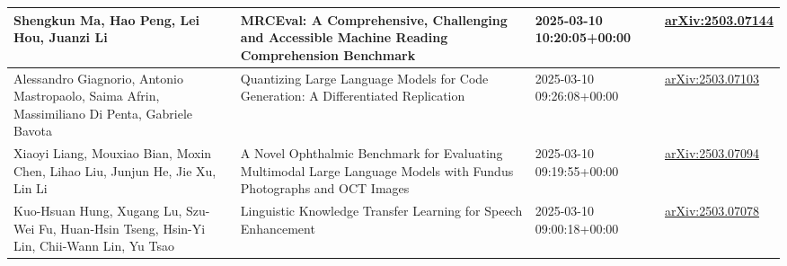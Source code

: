\documentclass[dvipdfmx]{article}
\newlength\autolength
\begin{document}
\begin{longtable}{|P{\autolength}|P{\autolength}|P{\autolength}|P{\autolength}|}
Shengkun Ma, Hao Peng, Lei Hou, Juanzi Li & MRCEval: A Comprehensive, Challenging and Accessible Machine Reading Comprehension Benchmark & 2025-03-10 10:20:05+00:00 & \href{http://arxiv.org/abs/2503.07144v1}{arXiv:2503.07144} \\ \hline
Alessandro Giagnorio, Antonio Mastropaolo, Saima Afrin, Massimiliano Di Penta, Gabriele Bavota & Quantizing Large Language Models for Code Generation: A Differentiated Replication & 2025-03-10 09:26:08+00:00 & \href{http://arxiv.org/abs/2503.07103v1}{arXiv:2503.07103} \\ \hline
Xiaoyi Liang, Mouxiao Bian, Moxin Chen, Lihao Liu, Junjun He, Jie Xu, Lin Li & A Novel Ophthalmic Benchmark for Evaluating Multimodal Large Language Models with Fundus Photographs and OCT Images & 2025-03-10 09:19:55+00:00 & \href{http://arxiv.org/abs/2503.07094v1}{arXiv:2503.07094} \\ \hline
Kuo-Hsuan Hung, Xugang Lu, Szu-Wei Fu, Huan-Hsin Tseng, Hsin-Yi Lin, Chii-Wann Lin, Yu Tsao & Linguistic Knowledge Transfer Learning for Speech Enhancement & 2025-03-10 09:00:18+00:00 & \href{http://arxiv.org/abs/2503.07078v1}{arXiv:2503.07078} \\ \hline
\end{longtable}
\end{document}
